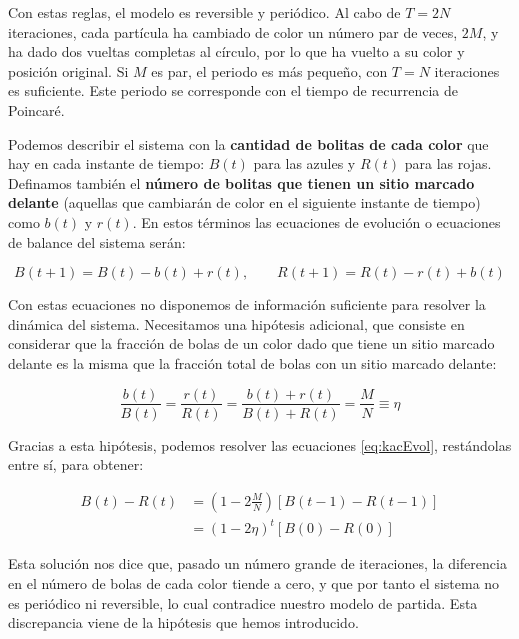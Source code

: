 \documentclass[11pt, a4paper]{article} %
\theoremstyle{named}
\begin{document}
        Con estas reglas, el modelo es reversible y periódico. Al cabo de $T = 2N$ iteraciones, cada partícula ha cambiado de color un número par de veces, $2M$, y ha dado dos vueltas completas al círculo, por lo que ha vuelto a su color y posición original. Si $M$ es par, el periodo es más pequeño, con $T=N$ iteraciones es suficiente. Este periodo se corresponde con el tiempo de recurrencia de Poincaré.

        Podemos describir el sistema con la \textbf{cantidad de bolitas de cada color} que hay en cada instante de tiempo: $B(t)$ para las azules y $R(t)$ para las rojas. Definamos también el \textbf{número de bolitas que tienen un sitio marcado delante} (aquellas que cambiarán de color en el siguiente instante de tiempo) como $b(t)$ y $r(t)$. En estos términos las ecuaciones de evolución o ecuaciones de balance del sistema serán:

        \begin{equation}\label{eq:kacEvol}
            B(t+1) = B(t) - b(t) + r(t), \qquad
            R(t+1) = R(t) - r(t) + b(t)
        \end{equation}

        Con estas ecuaciones no disponemos de información suficiente para resolver la dinámica del sistema. Necesitamos una hipótesis adicional, que consiste en considerar que la fracción de bolas de un color dado que tiene un sitio marcado delante es la misma que la fracción total de bolas con un sitio marcado delante:

        \begin{equation}\label{eq:kacHip}
        \frac{b(t)}{B(t)} = \frac{r(t)}{R(t)} = \frac{b(t) + r(t)}{B(t) + R(t)} = \frac{M}{N} \equiv \eta
        \end{equation}

        Gracias a esta hipótesis, podemos resolver las ecuaciones \eqref{eq:kacEvol}, restándolas entre sí, para obtener:

        \begin{equation}
            \begin{aligned}
            B(t)-R(t) &=\left(1-2 \frac{M}{N}\right)\left[B(t-1)-R(t-1)\right] \nonumber \\
            &=\left(1-2 \eta\right)^{t}\left[B(0)-R(0)\right]
            \end{aligned}
        \end{equation}

        Esta solución nos dice que, pasado un número grande de iteraciones, la diferencia en el número de bolas de cada color tiende a cero, y que por tanto el sistema no es periódico ni reversible, lo cual contradice nuestro modelo de partida. Esta discrepancia viene de la hipótesis que hemos introducido.
\end{document}

